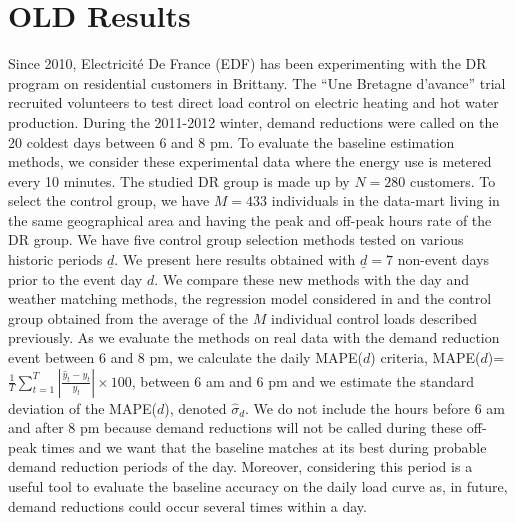 \documentclass[journal]{IEEEtran}
\begin{document}
\section{OLD Results}\label{sec:res}
Since 2010, Electricit{\'e} De France (EDF) has been experimenting with the 
DR program on residential customers in Brittany. 
The ``Une Bretagne d'avance'' trial recruited volunteers to test direct 
load control on electric heating and hot water production. During the 2011-2012 winter, demand 
reductions were called on the 20 coldest days between 6 and 8 pm. To evaluate the baseline estimation methods, 
we consider these experimental data where the energy use is metered every 10 minutes. The 
studied DR group is made up by $N=280$ customers. To select the control group, we 
have $M=433$ individuals in the data-mart living in the same geographical area and having the peak 
and off-peak hours rate of the DR group. We have five control group selection methods tested on various historic periods 
$\underline{d}$. We present here results obtained with $\underline{d}=7$ 
non-event days prior to the event day $d$. We 
compare these new methods with the day and weather matching methods, the regression model 
considered in \cite{quantifying_berk} and the control group obtained from the average of the 
$M$ individual control loads described previously. As we evaluate the 
methods on real data with the demand reduction event between 6 and 8 pm, we calculate 
the daily MAPE($d$) criteria, MAPE($d$)=$\frac{1}{T}\sum_{t=1}^T |\frac{\hat{y}_t-y_t}{y_t}|\times 100$, 
between 6 am and 6 pm and we estimate the standard deviation of the MAPE($d$), denoted 
$\hat{\sigma}_d$. We do not include the hours before 6 am and after 8 pm because 
demand reductions will not be called during these off-peak times and we want that 
the baseline matches at its best during probable demand reduction periods of the 
day. Moreover, considering this period 
is a useful tool to evaluate the baseline accuracy on the daily load curve 
as, in future, demand reductions could occur several times within a day. 
\end{document}
